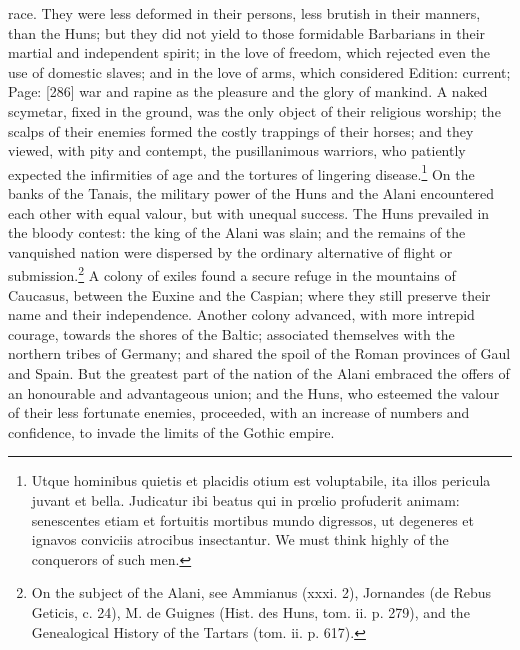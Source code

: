 race. They were less deformed in their persons, less brutish in their manners, than the Huns; but they did not yield to those formidable Barbarians in their martial and independent spirit; in the love of freedom, which rejected even the use of domestic slaves; and in the love of arms, which considered Edition: current; Page: [286] war and rapine as the pleasure and the glory of mankind. A naked scymetar, fixed in the ground, was the only object of their religious worship; the scalps of their enemies formed the costly trappings of their horses; and they viewed, with pity and contempt, the pusillanimous warriors, who patiently expected the infirmities of age and the tortures of lingering disease.\footnote{Utque hominibus quietis et placidis otium est voluptabile, ita illos pericula juvant et bella. Judicatur ibi beatus qui in prœlio profuderit animam: senescentes etiam et fortuitis mortibus mundo digressos, ut degeneres et ignavos conviciis atrocibus insectantur. We must think highly of the conquerors of such men.} On the banks of the Tanais, the military power of the Huns and the Alani encountered each other with equal valour, but with unequal success. The Huns prevailed in the bloody contest: the king of the Alani was slain; and the remains of the vanquished nation were dispersed by the ordinary alternative of flight or submission.\footnote{On the subject of the Alani, see Ammianus (xxxi. 2), Jornandes (de Rebus Geticis, c. 24), M. de Guignes (Hist. des Huns, tom. ii. p. 279), and the Genealogical History of the Tartars (tom. ii. p. 617).} A colony of exiles found a secure refuge in the mountains of Caucasus, between the Euxine and the Caspian; where they still preserve their name and their independence. Another colony advanced, with more intrepid courage, towards the shores of the Baltic; associated themselves with the northern tribes of Germany; and shared the spoil of the Roman provinces of Gaul and Spain. But the greatest part of the nation of the Alani embraced the offers of an honourable and advantageous union; and the Huns, who esteemed the valour of their less fortunate enemies, proceeded, with an increase of numbers and confidence, to invade the limits of the Gothic empire.

